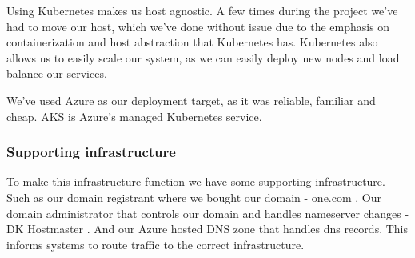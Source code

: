 Using Kubernetes makes us host agnostic.
A few times during the project we've had to move our host, which we've done without issue due to the emphasis on containerization and host abstraction that Kubernetes has.
Kubernetes also allows us to easily scale our system, as we can easily deploy new nodes and load balance our services.

We've used Azure as our deployment target, as it was reliable, familiar and cheap. AKS is Azure's managed Kubernetes service.

\subsubsection{Supporting infrastructure}
To make this infrastructure function we have some supporting infrastructure.
Such as our domain registrant where we bought our domain - one.com \cite{onecom}.
Our domain administrator that controls our domain and handles nameserver changes - DK Hostmaster \cite{dk-hostmaster}.
And our Azure hosted DNS zone \cite{tool:dns-zone} that handles dns records. This informs systems to route traffic to the correct infrastructure.
